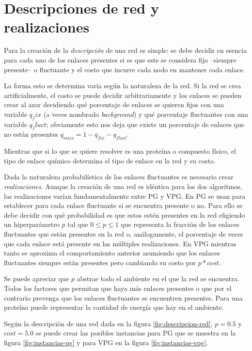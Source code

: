 \section{Descripciones de red y realizaciones} \label{descripciones-realizaciones}
Para la creación de la \emph{descripción} de una red es simple: se debe decidir en esencia para cada uno de los enlaces presentes si es que este se considera fijo --siempre presente-- o fluctuante y el costo que incurre cada nodo en mantener cada enlace.

La forma esto se determina varía según la naturaleza de la red. Si la red se crea artificialmente, el costo se puede decidir arbitrariamente y los enlaces se pueden crear al azar decidiendo qué porcentaje de enlaces se quieren fijos con una variable $q_fix$ (a veces nombrado \emph{background}) y qué porcentaje fluctuantes con una variable $q_fluct$; obviamente esto nos deja que existe un porcentaje de enlaces que no están presentes $q_{miss} = 1-q_{fix}-q_{fluct}$.

Mientras que si lo que se quiere resolver es una proteína o compuesto físico, el tipo de enlace químico determina el tipo de enlace en la red y su costo.

Dada la naturaleza probabilística de los enlaces fluctuantes es necesario crear \emph{realizaciones}. Aunque la creación de una red es idéntica para los dos algoritmos, las realizaciones varían fundamentalmente entre PG y VPG. En PG se usan para establecer para cada enlace fluctuante si se encuentra presente o no. Para ello se debe decidir con qué probabilidad es que estos estén presentes en la red eligiendo un hiperparámetro $p$ tal que $0\leq p \leq 1$ que representa la fracción de los enlaces fluctuantes que están presentes en la red o, análogamente, el porcentaje de veces que cada enlace está presente en las múltiples realizaciones. En VPG mientras tanto se aproxima el comportamiento anterior asumiendo que los enlaces fluctuantes siempre están presentes pero cambiando su costo por $p*cost$.

Se puede apreciar que $p$ abstrae todo el ambiente en el que la red se encuentra. Todos los factores que permitan que haya más enlaces presentes o que por el contrario prevenga que los enlaces fluctuantes se encuentren presentes. Para una proteína puede representar la cantidad de energía que hay en el ambiente.

Según la descripción de una red dada en la figura \ref{fig:descripcion-red}, $p=0.5$ y $cost=5.0$ se puede crear las posibles instancias para PG que se muestra en la figura \ref{fig:instancias-pg} y para VPG en la figura \ref{fig:instancias-vpg}.

